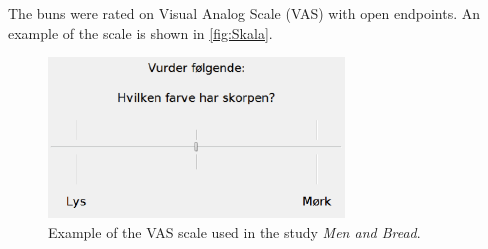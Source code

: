 The buns were rated on Visual Analog Scale (VAS) with open endpoints. An example of the scale is shown in \autoref{fig:Skala}. 
%
\begin{figure}[H]
\centering
\includegraphics[width =0.7\textwidth]{Figure/Skala}
\caption{Example of the VAS scale used in the study \textit{Men and Bread}.}
\label{fig:Skala}
\end{figure}
\noindent









